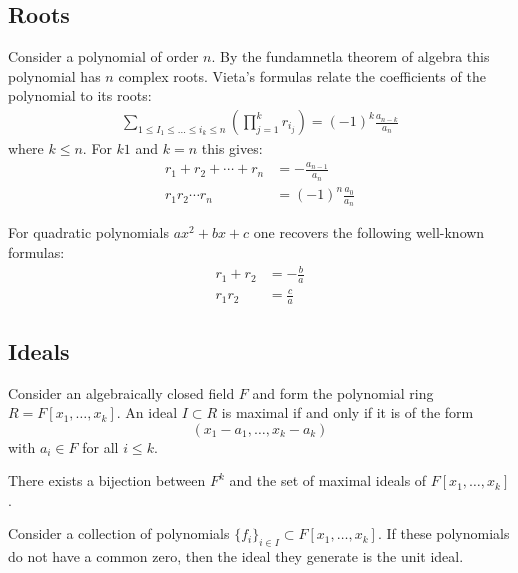 \subsection{Roots}

	\begin{formula}[Vieta]
		Consider a polynomial of order $n$. By the fundamnetla theorem of algebra this polynomial has $n$ complex roots. Vieta's formulas relate the coefficients of the polynomial to its roots:
		\begin{gather}
			\sum_{1\leq I_1\leq...\leq i_k\leq n}\left(\prod_{j=1}^kr_{i_j}\right) = (-1)^k\frac{a_{n-k}}{a_n}
		\end{gather}
		where $k\leq n$. For $k1$ and $k=n$ this gives:
		\begin{align}
			r_1+r_2+\cdots+r_n &= -\frac{a_{n-1}}{a_n}\\
			r_1r_2\cdots r_n &= (-1)^n\frac{a_0}{a_n}
		\end{align}
	\end{formula}
	\begin{example}
		For quadratic polynomials $ax^2+bx+c$ one recovers the following well-known formulas:
		\begin{align}
			r_1+r_2 &= -\frac{b}{a}\\
			r_1r_2 &= \frac{c}{a}
		\end{align}
	\end{example}

\subsection{Ideals}

	\begin{theorem}
		Consider an algebraically closed field $F$ and form the polynomial ring $R=F[x_1, \ldots, x_k]$. An ideal $I\subset R$ is maximal if and only if it is of the form \[(x_1-a_1, \ldots, x_k-a_k)\] with $a_i\in F$ for all $i\leq k$.
	\end{theorem}
	\begin{result}
		There exists a bijection between $F^k$ and the set of maximal ideals of $F[x_1, \ldots, x_k]$.
	\end{result}
	\begin{result}
		Consider a collection of polynomials $\{f_i\}_{i\in I}\subset F[x_1, \ldots, x_k]$. If these polynomials do not have a common zero, then the ideal they generate is the unit ideal.
	\end{result}

